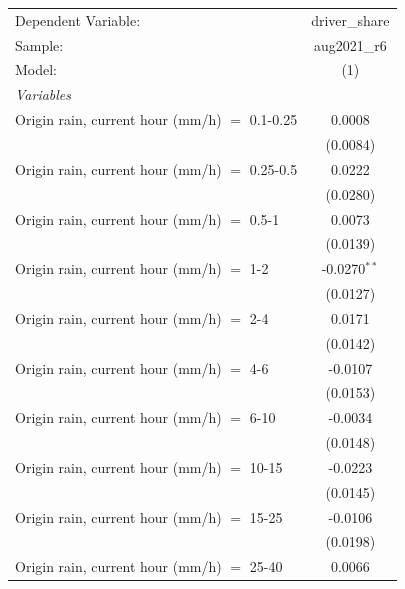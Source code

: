\ifdefined\ifclassloaded
{}
\fi

\begingroup
\centering
\begin{tabular}{lc}
   \tabularnewline \midrule \midrule
   Dependent Variable:                           & driver\_share\\   
   Sample:                                       & aug2021\_r6 \\    
   Model:                                        & (1)\\  
   \midrule
   \emph{Variables}\\
   Origin rain, current hour (mm/h) $=$ 0.1-0.25 & 0.0008\\   
                                                 & (0.0084)\\   
   Origin rain, current hour (mm/h) $=$ 0.25-0.5 & 0.0222\\   
                                                 & (0.0280)\\   
   Origin rain, current hour (mm/h) $=$ 0.5-1    & 0.0073\\   
                                                 & (0.0139)\\   
   Origin rain, current hour (mm/h) $=$ 1-2      & -0.0270$^{**}$\\   
                                                 & (0.0127)\\   
   Origin rain, current hour (mm/h) $=$ 2-4      & 0.0171\\   
                                                 & (0.0142)\\   
   Origin rain, current hour (mm/h) $=$ 4-6      & -0.0107\\   
                                                 & (0.0153)\\   
   Origin rain, current hour (mm/h) $=$ 6-10     & -0.0034\\   
                                                 & (0.0148)\\   
   Origin rain, current hour (mm/h) $=$ 10-15    & -0.0223\\   
                                                 & (0.0145)\\   
   Origin rain, current hour (mm/h) $=$ 15-25    & -0.0106\\   
                                                 & (0.0198)\\   
   Origin rain, current hour (mm/h) $=$ 25-40    & 0.0066\\   

\end{tabular}

